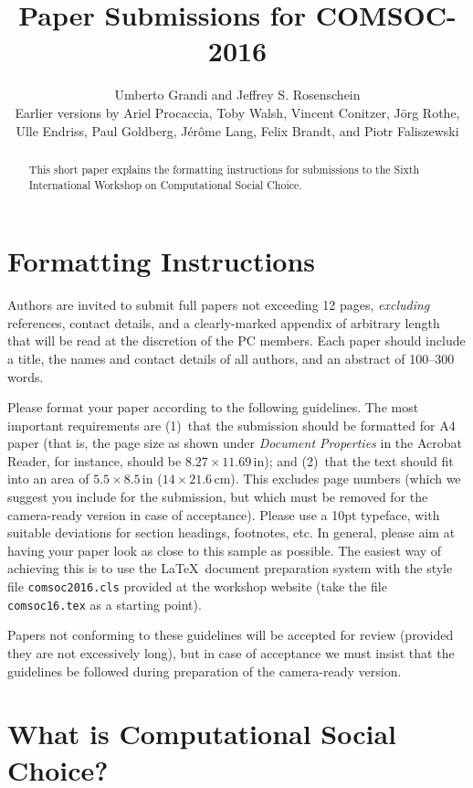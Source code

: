 \documentclass{comsoc2016}
\title{Paper Submissions for COMSOC-2016}
\author{Umberto Grandi and Jeffrey S. Rosenschein\\$ $ \\
\footnotesize{Earlier versions by Ariel Procaccia, Toby Walsh, Vincent Conitzer, J\"org Rothe, Ulle Endriss, Paul Goldberg, J\'er\^ome Lang, Felix Brandt, and Piotr Faliszewski}}
\begin{document}

\begin{abstract}
  This short paper explains the formatting instructions for
  submissions to the Sixth International Workshop on Computational
  Social Choice.
\end{abstract}


\section{Formatting Instructions}

Authors are invited to submit full papers not exceeding 12 pages, 
\emph{excluding} references, contact details, and a clearly-marked appendix of arbitrary length that will be read at the discretion of the PC members. 
Each paper should include 
a title, the names and contact details of all authors, and an abstract 
of 100--300 words.


Please format your paper according to the following guidelines.
The most important requirements are (1)~that the submission should be 
formatted for A4 paper (that is, the page size as shown under 
\emph{Document Properties} in the Acrobat Reader, for instance, should 
be $8.27\times 11.69\,\mbox{in}$); and (2)~that the text should fit into 
an area of $5.5\times 8.5\,\mbox{in}$ ($14\times 21.6\,\mbox{cm}$). 
This excludes page numbers (which we suggest you include for the 
submission, but which must be removed for the camera-ready version in 
case of acceptance). Please use a 10pt typeface, with suitable deviations
for section headings, footnotes, etc. In general, please aim at having 
your paper look as close to this sample as possible. The easiest way of 
achieving this is to use the \LaTeX\ document preparation system with the 
style file \texttt{comsoc2016.cls} provided at the workshop website 
(take the file \texttt{comsoc16.tex} as a starting point).

Papers not conforming to these guidelines will be accepted for review
(provided they are not excessively long), but in case of acceptance we
must insist that the guidelines be followed during preparation of the 
camera-ready version.  


\section{What is Computational Social Choice?}
\end{document}
